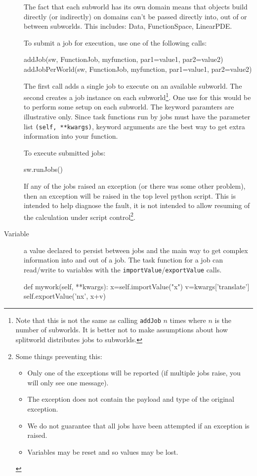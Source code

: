 \begin{description}
The fact that each subworld has its own domain means that objects build directly (or indirectly) on domains 
can't be passed directly into, out of or between subworlds.
This includes: Data, FunctionSpace, LinearPDE.

To submit a job for execution, use one of the following calls:

\begin{python}
addJob(sw, FunctionJob, myfunction, par1=value1, par2=value2)  
addJobPerWorld(sw, FunctionJob, myfunction, par1=value1, par2=value2)   
\end{python}

The first call adds a single job to execute on an available subworld.
The second creates a job instance on each subworld\footnote{
Note that this is not the same as calling \texttt{addJob} $n$ times where $n$ is the number of subworlds.
It is better not to make assumptions about how splitworld distributes jobs to subworlds.
}.
One use for this would be to perform some setup on each subworld. 
The keyword paramters are illustrative only.
Since task functions run by jobs must have the parameter list \texttt{(self, **kwargs)}, keyword arguments are the best way
to get extra information into your function.

To execute submitted jobs:
\begin{python}
sw.runJobs() 
\end{python}

If any of the jobs raised an exception (or there was some other problem), then an exception will be raised in the 
top level python script.
This is intended to help diagnose the fault, it is not intended to allow resuming of the calculation under script control\footnote{
Some things preventing this:
\begin{itemize}
 \item Only one of the exceptions will be reported (if multiple jobs raise, you will only see one message).
 \item The exception does not contain the payload and type of the original exception.
 \item We do not guarantee that all jobs have been attempted if an exception is raised.
 \item Variables may be reset and so values may be lost.
\end{itemize}
}.





\item[Variable] a value declared to persist between jobs and the main way to get complex information into and out of a job.
The task function for a job can read/write to variables with the \texttt{importValue}/\texttt{exportValue} calls.
\begin{python}
def mywork(self, **kwargs):
   x=self.importValue("x")
   v=kwargs['translate']
   self.exportValue('nx', x+v)
\end{python}


\end{description}
